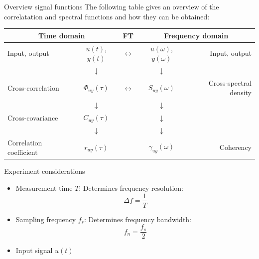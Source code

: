 \documentclass{beamer}
\begin{document}
\begin{frame}{Overview signal functions}
		The following table gives an overview of the correlatation and spectral functions and how they can be obtained:
		\begin{table}
		\begin{tabular}{lc|c|cr}
				\toprule
				\multicolumn{2}{c|}{Time domain}  & FT & \multicolumn{2}{c}{Frequency domain}  \\
				\midrule
				Input, output & $u(t)$, $y(t)$ &$\leftrightarrow$ & $u(\omega)$, $y(\omega)$ &  Input, output\\
					& $\downarrow$ &  & $\downarrow$ & \\
				Cross-correlation & $\Phi_{uy}(\tau)$ &$\leftrightarrow$  & $S_{uy}(\omega)$ & Cross-spectral density \\
					& $\downarrow$ &   &$\downarrow$  &\\
				Cross-covariance & $C_{uy}(\tau)$ & &$\downarrow$ &  \\
					& $\downarrow$ &   & $\downarrow$  &\\
				Correlation coefficient & $r_{uy}(\tau)$ & & $\gamma_{uy}(\omega)$  & Coherency  \\
				\bottomrule
		\end{tabular}
		\end{table}
\end{frame}

\begin{frame}{Experiment considerations}
\begin{itemize}
\item Measurement time $T$: Determines frequency resolution:
\begin{equation}\Delta f = \frac{1}{T}\end{equation}%
\item Sampling frequency $f_s$: Determines frequency bandwidth:
\begin{equation} f_n = \frac{f_s}{2} \end{equation}%
\item Input signal $u(t)$%
\end{itemize}
\end{frame}
\end{document}
